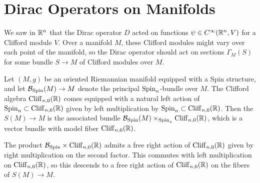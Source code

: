 %
\section{Dirac Operators on Manifolds}
%
We saw in $\mathbb{R}^n$ that the Dirac operator $D$ acted on functions
$\psi \in C^\infty(\mathbb{R}^n, V)$ for a Clifford module $V$. Over a manifold $M$,
these Clifford modules might vary over each point of the manifold, so the
Dirac operator should act on sections $\Gamma_M(S)$ for some bundle $S \to M$
of Clifford modules over $M$.
%
\begin{defn}
Let $(M,g)$ be an oriented Riemannian manifold equipped with a Spin structure,
and let $\mathcal{B}_{\mathrm{Spin}}(M) \to M$ denote the principal $\mathrm{Spin}_n$-bundle over $M$.
The Clifford algebra $\operatorname{Cliff}_{n,0}(\mathbb{R})$ comes equipped with a natural left
action of $\mathrm{Spin}_n \subset \operatorname{Cliff}_{n,0}(\mathbb{R})$ given by left multiplication by
$\mathrm{Spin}_n \subset \operatorname{Cliff}_{n,0}(\mathbb{R})$. Then the  $S(M) \to M$ is
the associated bundle $\mathcal{B}_{\mathrm{Spin}}(M) \times_{\mathrm{Spin}_n} \operatorname{Cliff}_{n,0}(\mathbb{R})$,
which is a vector bundle with model fiber $\operatorname{Cliff}_{n,0}(\mathbb{R})$.
\end{defn}
%
The product $\mathcal{B}_{\mathrm{Spin}} \times \operatorname{Cliff}_{n,0}(\mathbb{R})$ admits a free right action of
$\operatorname{Cliff}_{n,0}(\mathbb{R})$ given by right multiplication on the second factor. This
commutes with left multiplication on $\operatorname{Cliff}_{n,0}(\mathbb{R})$, so this descends to a
free right action of $\operatorname{Cliff}_{n,0}(\mathbb{R})$ on the fibers of $S(M) \to M$.
